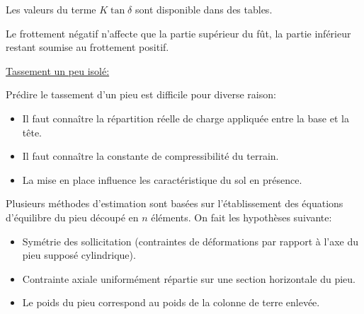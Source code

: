         Les valeurs du terme $K \tan \delta$ sont disponible dans des tables.
        
        Le frottement négatif n'affecte que la partie supérieur du fût, la partie inférieur restant soumise au frottement positif. 
        
        \underline{Tassement un peu isolé:} 
        
        Prédire le tassement d'un pieu est difficile pour diverse raison:
        \begin{itemize}
            \item Il faut connaître la répartition réelle de charge appliquée entre la base et la tête.
            \item Il faut connaître la constante de compressibilité du terrain.
            \item La mise en place influence les caractéristique du sol en présence.
        \end{itemize} 
        
        Plusieurs méthodes d'estimation sont basées sur l'établissement des équations d'équilibre du pieu découpé en $n$ éléments. On fait les hypothèses suivante: 
        \begin{itemize}
            \item Symétrie des sollicitation (contraintes de déformations par rapport à l'axe du pieu supposé cylindrique).
            \item Contrainte axiale uniformément répartie sur une section horizontale du pieu.
            \item Le poids du pieu correspond au poids de la colonne de terre enlevée.
        \end{itemize} 
        
